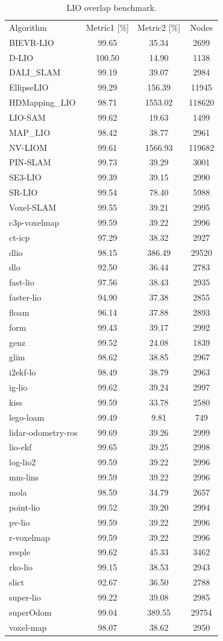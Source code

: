 \begin{table}[]
\centering
\begin{tabular}{lccc}
\rowcolor[HTML]{C0C0C0}
Algorithm & Metric1 [\%] & Metric2 [\%] & Nodes \\
BIEVR-LIO & 99.65 & 35.34 & 2699 \\
D-LIO & 100.50 & 14.90 & 1138 \\
DALI_SLAM & 99.19 & 39.07 & 2984 \\
EllipseLIO & 99.29 & 156.39 & 11945 \\
HDMapping_LIO & 98.71 & 1553.02 & 118620 \\
LIO-SAM & 99.62 & 19.63 & 1499 \\
MAP_LIO & 98.42 & 38.77 & 2961 \\
NV-LIOM & 99.61 & 1566.93 & 119682 \\
PIN-SLAM & 99.73 & 39.29 & 3001 \\
SE3-LIO & 99.39 & 39.15 & 2990 \\
SR-LIO & 99.54 & 78.40 & 5988 \\
Voxel-SLAM & 99.55 & 39.21 & 2995 \\
c3p-voxelmap & 99.59 & 39.22 & 2996 \\
ct-icp & 97.29 & 38.32 & 2927 \\
dlio & 98.15 & 386.49 & 29520 \\
dlo & 92.50 & 36.44 & 2783 \\
fast-lio & 97.56 & 38.43 & 2935 \\
faster-lio & 94.90 & 37.38 & 2855 \\
floam & 96.14 & 37.88 & 2893 \\
form & 99.43 & 39.17 & 2992 \\
genz & 99.52 & 24.08 & 1839 \\
glim & 98.62 & 38.85 & 2967 \\
i2ekf-lo & 98.49 & 38.79 & 2963 \\
ig-lio & 99.62 & 39.24 & 2997 \\
kiss & 99.59 & 33.78 & 2580 \\
lego-loam & 99.49 & 9.81 & 749 \\
lidar-odometry-ros & 99.69 & 39.26 & 2999 \\
lio-ekf & 99.65 & 39.25 & 2998 \\
log-lio2 & 99.59 & 39.22 & 2996 \\
mm-lins & 99.59 & 39.22 & 2996 \\
mola & 98.59 & 34.79 & 2657 \\
point-lio & 99.52 & 39.20 & 2994 \\
pv-lio & 99.59 & 39.22 & 2996 \\
r-voxelmap & 99.59 & 39.22 & 2996 \\
resple & 99.62 & 45.33 & 3462 \\
rko-lio & 99.15 & 38.53 & 2943 \\
slict & 92.67 & 36.50 & 2788 \\
super-lio & 99.22 & 39.08 & 2985 \\
superOdom & 99.04 & 389.55 & 29754 \\
voxel-map & 98.07 & 38.62 & 2950 \\
\end{tabular}
\caption{LIO overlap benchmark.}
\label{tab:lio_overlap}
\end{table}